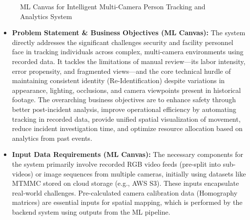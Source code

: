 \begin{figure}[!htb]
    \centering
    \caption{ML Canvas for Intelligent Multi-Camera Person Tracking and Analytics System}
    \label{fig:ml_canvas}
\end{figure}
\clearpage
\begin{itemize}
    \item \textbf{Problem Statement \& Business Objectives (ML Canvas):}
        The system directly addresses the significant challenges security and facility personnel face in tracking individuals across complex, multi-camera environments using recorded data. It tackles the limitations of manual review—its labor intensity, error propensity, and fragmented views—and the core technical hurdle of maintaining consistent identity (Re-Identification) despite variations in appearance, lighting, occlusions, and camera viewpoints present in historical footage. The overarching business objectives are to enhance safety through better post-incident analysis, improve operational efficiency by automating tracking in recorded data, provide unified spatial visualization of movement, reduce incident investigation time, and optimize resource allocation based on analytics from past events.

    \item \textbf{Input Data Requirements (ML Canvas):}
        The necessary components for the system primarily involve recorded RGB video feeds (pre-split into sub-videos) or image sequences from multiple cameras, initially using datasets like MTMMC stored on cloud storage (e.g., AWS S3). These inputs encapsulate real-world challenges. Pre-calculated camera calibration data (Homography matrices) are essential inputs for spatial mapping, which is performed by the backend system using outputs from the ML pipeline.


\end{itemize}
